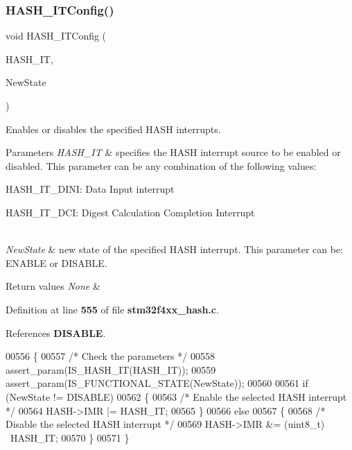 \subsubsection{H\+A\+S\+H\+\_\+\+I\+T\+Config()}
{\footnotesize\ttfamily void H\+A\+S\+H\+\_\+\+I\+T\+Config (\begin{DoxyParamCaption}\item[{uint8\+\_\+t}]{H\+A\+S\+H\+\_\+\+IT,  }\item[{\textbf{ Functional\+State}}]{New\+State }\end{DoxyParamCaption})}



Enables or disables the specified H\+A\+SH interrupts. 


\begin{DoxyParams}{Parameters}
{\em H\+A\+S\+H\+\_\+\+IT} & specifies the H\+A\+SH interrupt source to be enabled or disabled. This parameter can be any combination of the following values\+: \begin{DoxyItemize}
\item H\+A\+S\+H\+\_\+\+I\+T\+\_\+\+D\+I\+NI\+: Data Input interrupt \item H\+A\+S\+H\+\_\+\+I\+T\+\_\+\+D\+CI\+: Digest Calculation Completion Interrupt \end{DoxyItemize}
\\
\hline
{\em New\+State} & new state of the specified H\+A\+SH interrupt. This parameter can be\+: E\+N\+A\+B\+LE or D\+I\+S\+A\+B\+LE. \\
\hline
\end{DoxyParams}

\begin{DoxyRetVals}{Return values}
{\em None} & \\
\hline
\end{DoxyRetVals}


Definition at line \textbf{ 555} of file \textbf{ stm32f4xx\+\_\+hash.\+c}.



References \textbf{ D\+I\+S\+A\+B\+LE}.


\begin{DoxyCode}
00556 \{
00557   \textcolor{comment}{/* Check the parameters */}
00558   assert_param(IS_HASH_IT(HASH\_IT));
00559   assert_param(IS_FUNCTIONAL_STATE(NewState));
00560 
00561   \textcolor{keywordflow}{if} (NewState != DISABLE)
00562   \{
00563     \textcolor{comment}{/* Enable the selected HASH interrupt */}
00564     HASH->IMR |= HASH\_IT;
00565   \}
00566   \textcolor{keywordflow}{else}
00567   \{
00568     \textcolor{comment}{/* Disable the selected HASH interrupt */}
00569     HASH->IMR &= (uint8\_t) ~HASH\_IT;
00570   \}
00571 \}
\end{DoxyCode}
